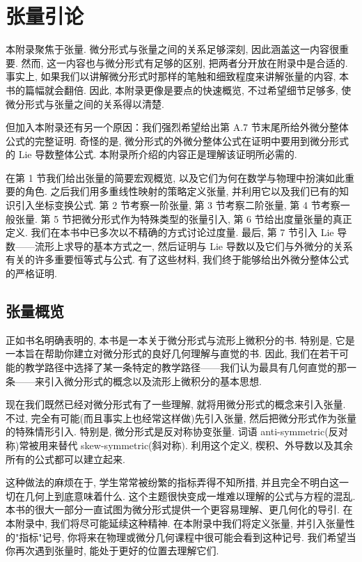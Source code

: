 \chapter{张量引论}

本附录聚焦于张量. 微分形式与张量之间的关系足够深刻, 因此涵盖这一内容很重要. 然而, 这一内容也与微分形式有足够的区别, 把两者分开放在附录中是合适的. 事实上, 如果我们以讲解微分形式时那样的笔触和细致程度来讲解张量的内容, 本书的篇幅就会翻倍. 因此, 本附录更像是要点的快速概览, 不过希望细节足够多, 使微分形式与张量之间的关系得以清楚.

但加入本附录还有另一个原因：我们强烈希望给出第 A.7 节末尾所给外微分整体公式的完整证明. 奇怪的是, 微分形式的外微分整体公式在证明中要用到微分形式的 Lie 导数整体公式. 本附录所介绍的内容正是理解该证明所必需的.

在第 1 节我们给出张量的简要宏观概览, 以及它们为何在数学与物理中扮演如此重要的角色. 之后我们用多重线性映射的策略定义张量, 并利用它以及我们已有的知识引入坐标变换公式. 第 2 节考察一阶张量, 第 3 节考察二阶张量, 第 4 节考察一般张量. 第 5 节把微分形式作为特殊类型的张量引入, 第 6 节给出度量张量的真正定义. 我们在本书中已多次以不精确的方式讨论过度量. 最后, 第 7 节引入 Lie 导数——流形上求导的基本方式之一, 然后证明与 Lie 导数以及它们与外微分的关系有关的许多重要恒等式与公式. 有了这些材料, 我们终于能够给出外微分整体公式的严格证明.

\section{张量概览}

正如书名明确表明的, 本书是一本关于微分形式与流形上微积分的书. 特别是, 它是一本旨在帮助你建立对微分形式的良好几何理解与直觉的书. 因此, 我们在若干可能的教学路径中选择了某一条特定的教学路径——我们认为最具有几何直觉的那一条——来引入微分形式的概念以及流形上微积分的基本思想.

现在我们既然已经对微分形式有了一些理解, 就将用微分形式的概念来引入张量. 不过, 完全有可能(而且事实上也经常这样做)先引入张量, 然后把微分形式作为张量的特殊情形引入. 特别是, 微分形式是反对称协变张量. 词语 anti-symmetric(反对称)常被用来替代 skew-symmetric(斜对称). 利用这个定义, 楔积、外导数以及其余所有的公式都可以建立起来.

这种做法的麻烦在于, 学生常常被纷繁的指标弄得不知所措, 并且完全不明白这一切在几何上到底意味着什么. 这个主题很快变成一堆难以理解的公式与方程的混乱. 本书的很大一部分一直试图为微分形式提供一个更容易理解、更几何化的导引. 在本附录中, 我们将尽可能延续这种精神. 在本附录中我们将定义张量, 并引入张量性的"指标"记号, 你将来在物理或微分几何课程中很可能会看到这种记号. 我们希望当你再次遇到张量时, 能处于更好的位置去理解它们.


